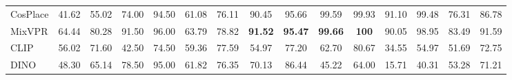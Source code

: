 \begin{table}[H]
{\begin{tabular}{lcccccccccccccc}
      CosPlace                               & 41.62                                                           & 55.02                                                              & 74.00                                                          & 94.50                                                          & 61.08                                                         & 76.11                                                       & 90.45                                 & 95.66                    & 99.59                    & 99.93                    & 91.10                    & 99.48                    & 76.31                    & 86.78                    \\
      MixVPR                                 & 64.44                                                           & 80.28                                                              & 91.50                                                          & 96.00                                                          & 63.79                                                         & 78.82                                                       & \textbf{91.52}                        & \textbf{95.47}           & \textbf{99.66}           & \textbf{100}             & 90.05                    & 98.95                    & 83.49                    & 91.59                    \\ \hline
      CLIP                                   & 56.02                                                           & 71.60                                                              & 42.50                                                          & 74.50                                                          & 59.36                                                         & 77.59                                                       & 54.97                                 & 77.20                    & 62.70                    & 80.67                    & 34.55                    & 54.97                    & 51.69                    & 72.75                    \\
      DINO                                   & 48.30                                                           & 65.14                                                              & 78.50                                                          & 95.00                                                          & 61.82                                                         & 76.35                                                       & 70.13                                 & 86.44                    & 45.22                    & 64.00                    & 15.71                    & 40.31                    & 53.28                    & 71.21                    \\

\end{tabular}}
\end{table}
